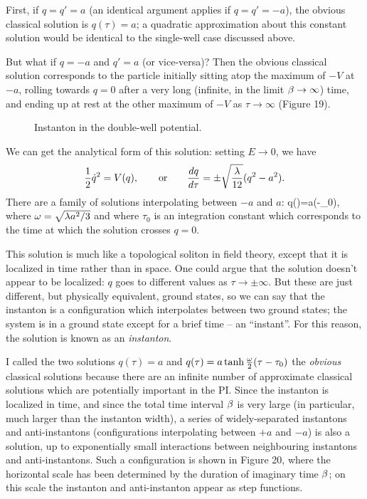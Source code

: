 \documentclass[12pt]{article}
\begin{document}
First, if $q=q'=a$ (an identical argument applies if $q=q'=-a$), the
obvious classical
solution is $q(\tau)=a$; a quadratic approximation about this
constant solution would be identical to the single-well case discussed
above.

But what if $q=-a$ and $q'=a$ (or vice-versa)? Then the obvious
classical solution corresponds to the particle initially sitting atop the
maximum of $-V$ at $-a$, rolling towards $q=0$ after a very long
(infinite, in the limit ${\beta}\to\infty$) time, and ending up at
rest at the other maximum of $-V$ as $\tau\to\infty$ (Figure 19).
\begin{figure}[hb]
\epsfysize=5cm
\centerline{}
\caption{Instanton in the double-well potential.}
\end{figure}


We can get the analytical form of this solution: setting $E\to0$, we
have
\[
{\frac 12}{\dot q}^2=V(q),\qquad\mbox{or}\qquad
{dq\over d\tau}=\pm\sqrt{\lambda\over12}(q^2-a^2).
\]
There are a family of solutions interpolating between $-a$ and $a$:
\beq
q(\tau)=a(\tau-\tau_0),
\label{instanton}
\eeq
where ${\omega}=\sqrt{\lambda a^2/3}$ and where $\tau_0$ is an integration
constant which corresponds to the time at which the solution crosses
$q=0$.

This solution is much like a topological soliton in field theory,
except that it is localized in time rather than in space.
One could argue that the solution doesn't
appear to be localized: $q$ goes to different values as
$\tau\to\pm\infty$. But these are just different, but physically
equivalent, ground states, so we can say that the instanton is a
configuration which interpolates between two ground states; the
system is in a ground state except for a brief time -- an
``instant''. For this reason, the solution is known
as an {\em instanton}.

I called the two solutions $q(\tau)=a$ and
$q(\tau)=a\tanh{{\omega}\over2}(\tau-\tau_0)$ the {\em obvious} classical
solutions because there are an infinite number of approximate
classical solutions which are potentially important in the PI. Since
the instanton is localized in time, and since the total time interval
${\beta}$ is very large (in particular,
much larger than the instanton width), a series of widely-separated
instantons and anti-instantons (configurations interpolating between
$+a$ and $-a$) is also a solution, up to exponentially small
interactions between neighbouring instantons and anti-instantons. Such
a configuration is shown in Figure 20, where the horizontal scale has
been determined by the duration of imaginary time ${\beta}$; on this
scale the instanton and anti-instanton appear as step
functions.
\end{document}
